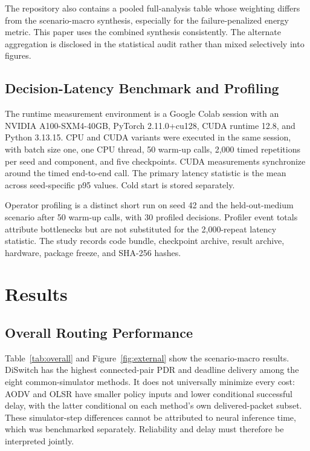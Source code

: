 \documentclass{ieeeaccess}
\newcommand{\DS}{DiSwitch}
\newif\ifreviewmarks
\newcommand{\DeleteCandidate}[2]{\ifreviewmarks\par\noindent{\color{ReviewRed}\textbf{Deletion/move candidate #1.} #2}\par\fi}
\begin{document}
The repository also contains a pooled full-analysis table whose weighting differs from the scenario-macro synthesis, especially for the failure-penalized energy metric. This paper uses the combined synthesis consistently. The alternate aggregation is disclosed in the statistical audit rather than mixed selectively into figures.

\subsection{Decision-Latency Benchmark and Profiling}

The runtime measurement environment is a Google Colab session with an NVIDIA A100-SXM4-40GB, PyTorch 2.11.0+cu128, CUDA runtime 12.8, and Python 3.13.15. CPU and CUDA variants were executed in the same session, with batch size one, one CPU thread, 50 warm-up calls, 2,000 timed repetitions per seed and component, and five checkpoints. CUDA measurements synchronize around the timed end-to-end call. The primary latency statistic is the mean across seed-specific p95 values. Cold start is stored separately.

Operator profiling is a distinct short run on seed 42 and the held-out-medium scenario after 50 warm-up calls, with 30 profiled decisions. Profiler event totals attribute bottlenecks but are not substituted for the 2,000-repeat latency statistic. The study records code bundle, checkpoint archive, result archive, hardware, package freeze, and SHA-256 hashes. \DeleteCandidate{D05}{An attempted expanded rerun for additional p90, maximum, coefficient-of-variation, and peak-device-memory fields was interrupted when the backend reclaimed the session; no values are imputed from that failed job.}

\section{Results}

\subsection{Overall Routing Performance}

Table~\ref{tab:overall} and Figure~\ref{fig:external} show the scenario-macro results. \DS{} has the highest connected-pair PDR and deadline delivery among the eight common-simulator methods. It does not universally minimize every cost: AODV and OLSR have smaller policy inputs and lower conditional successful delay, with the latter conditional on each method's own delivered-packet subset. These simulator-step differences cannot be attributed to neural inference time, which was benchmarked separately. Reliability and delay must therefore be interpreted jointly.
\end{document}
